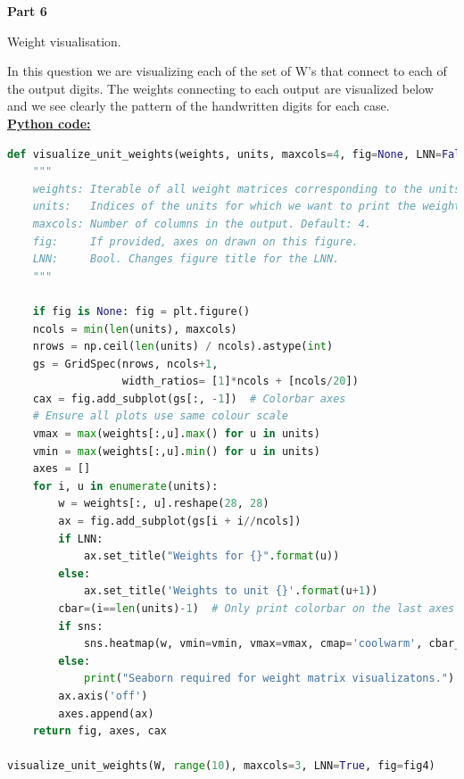 \documentclass{article}
\begin{document}
\pagebreak
\begin{center}
\textbf{Part 6 }
\end{center}


\begin{biomathg}
Weight visualisation.
\end{biomathg}

\vspace{0.5cm}


\noindent  In this question we are  visualizing each of the set of W's that connect to each of the output digits. The weights connecting to each output are visualized below and we see clearly the pattern of the handwritten digits for each case.  \\

\noindent \underline{\textbf{Python code:}} \\
\begin{biomathy}
\begin{lstlisting}[language=python]
def visualize_unit_weights(weights, units, maxcols=4, fig=None, LNN=False):
    """
    weights: Iterable of all weight matrices corresponding to the units.
    units:   Indices of the units for which we want to print the weights.
    maxcols: Number of columns in the output. Default: 4.
    fig:     If provided, axes on drawn on this figure.
    LNN:     Bool. Changes figure title for the LNN.
    """

    if fig is None: fig = plt.figure()
    ncols = min(len(units), maxcols)
    nrows = np.ceil(len(units) / ncols).astype(int)
    gs = GridSpec(nrows, ncols+1,
                  width_ratios= [1]*ncols + [ncols/20])
    cax = fig.add_subplot(gs[:, -1])  # Colorbar axes
    # Ensure all plots use same colour scale
    vmax = max(weights[:,u].max() for u in units)
    vmin = max(weights[:,u].min() for u in units)
    axes = []
    for i, u in enumerate(units):
        w = weights[:, u].reshape(28, 28)
        ax = fig.add_subplot(gs[i + i//ncols])
        if LNN:
            ax.set_title("Weights for {}".format(u))
        else:
            ax.set_title('Weights to unit {}'.format(u+1))
        cbar=(i==len(units)-1)  # Only print colorbar on the last axes
        if sns:
            sns.heatmap(w, vmin=vmin, vmax=vmax, cmap='coolwarm', cbar_ax=cax)
        else:
            print("Seaborn required for weight matrix visualizatons.")
        ax.axis('off')
        axes.append(ax)
    return fig, axes, cax

visualize_unit_weights(W, range(10), maxcols=3, LNN=True, fig=fig4)
\end{lstlisting}
\end{biomathy}
\end{document}
